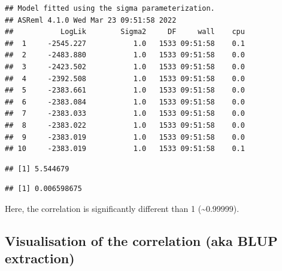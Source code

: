 \documentclass[
  12pt,
]{book}
\newenvironment{Shaded}{\begin{snugshade}}{\end{snugshade}}
\newcommand{\DataTypeTok}[1]{\textcolor[rgb]{0.13,0.29,0.53}{#1}}
\newcommand{\DecValTok}[1]{\textcolor[rgb]{0.00,0.00,0.81}{#1}}
\newcommand{\FloatTok}[1]{\textcolor[rgb]{0.00,0.00,0.81}{#1}}
\newcommand{\KeywordTok}[1]{\textcolor[rgb]{0.13,0.29,0.53}{\textbf{#1}}}
\newcommand{\NormalTok}[1]{#1}
\newcommand{\OperatorTok}[1]{\textcolor[rgb]{0.81,0.36,0.00}{\textbf{#1}}}
\newcommand{\StringTok}[1]{\textcolor[rgb]{0.31,0.60,0.02}{#1}}
\begin{document}
\begin{verbatim}
## Model fitted using the sigma parameterization.
## ASReml 4.1.0 Wed Mar 23 09:51:58 2022
##           LogLik        Sigma2     DF     wall    cpu
##  1     -2545.227           1.0   1533 09:51:58    0.1
##  2     -2483.880           1.0   1533 09:51:58    0.0
##  3     -2423.502           1.0   1533 09:51:58    0.0
##  4     -2392.508           1.0   1533 09:51:58    0.0
##  5     -2383.661           1.0   1533 09:51:58    0.0
##  6     -2383.084           1.0   1533 09:51:58    0.0
##  7     -2383.033           1.0   1533 09:51:58    0.0
##  8     -2383.022           1.0   1533 09:51:58    0.0
##  9     -2383.019           1.0   1533 09:51:58    0.0
## 10     -2383.019           1.0   1533 09:51:58    0.1
\end{verbatim}

\begin{Shaded}
\end{Shaded}

\begin{verbatim}
## [1] 5.544679
\end{verbatim}

\begin{Shaded}
\end{Shaded}

\begin{verbatim}
## [1] 0.006598675
\end{verbatim}

Here, the correlation is significantly different than 1 (\textasciitilde0.99999).

\hypertarget{visualisation-of-the-correlation-aka-blup-extraction}{%
\subsection{Visualisation of the correlation (aka BLUP extraction)}\label{visualisation-of-the-correlation-aka-blup-extraction}}
\end{document}
